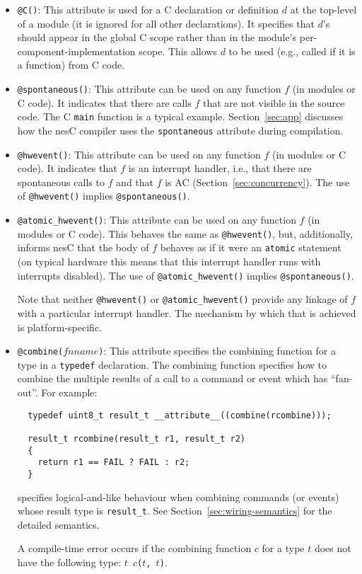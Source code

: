 \documentclass[11pt,letterpaper]{article}
\newcommand{\kw}[1]{{\tt #1}}
\newcommand{\code}[1]{{\tt #1}}
\newcommand{\nesc}{nesC\xspace}
\begin{document}
\begin{itemize}
\item \code{@C()}: This attribute is used for a C declaration or definition
$d$ at the top-level of a module (it is ignored for all other
declarations). It specifies that $d$'s should appear in the global C scope
rather than in the module's per-component-implementation scope. This allows
$d$ to be used (e.g., called if it is a function) from C code.

\item \code{@spontaneous()}: This attribute can be used on any function $f$
(in modules or C code). It indicates that there are calls $f$ that are not
visible in the source code. The C \code{main} function is a typical
example. Section~\ref{sec:app} discusses how the \nesc compiler uses the
\code{spontaneous} attribute during compilation.

\item \code{@hwevent()}: This attribute can be used on any function $f$ (in
modules or C code). It indicates that $f$ is an interrupt handler, i.e.,
that there are spontaneous calls to $f$ and that $f$ is AC
(Section~\ref{sec:concurrency}). The use of \code{@hwevent()} implies
\code{@spontaneous()}.

\item \code{@atomic\_hwevent()}: This attribute can be used on any function
$f$ (in modules or C code). This behaves the same as \code{@hwevent()}, but,
additionally, informs \nesc that the body of $f$ behaves as if it were an
\kw{atomic} statement (on typical hardware this means that this interrupt
handler runs with interrupts disabled). The use of \code{@atomic\_hwevent()}
implies \code{@spontaneous()}.

Note that neither \code{@hwevent()} or \code{@atomic\_hwevent()} provide any
linkage of $f$ with a particular interrupt handler. The mechanism by
which that is achieved is platform-specific.

\item \code{@combine($fnname$)}: This attribute specifies the combining
function for a type in a \kw{typedef} declaration. The combining function
specifies how to combine the multiple results of a call to a command
or event which has ``fan-out''. For example:
\begin{verbatim}
  typedef uint8_t result_t __attribute__((combine(rcombine)));

  result_t rcombine(result_t r1, result_t r2)
  {
    return r1 == FAIL ? FAIL : r2;
  }
\end{verbatim}
specifies logical-and-like behaviour when combining commands (or events)
whose result type is \code{result\_t}. See
Section~\ref{sec:wiring-semantics} for the detailed semantics.

A compile-time error occurs if the combining function $c$ for a type $t$
does not have the following type: \code{$t$ $c$($t$, $t$)}.

\end{itemize}
\end{document}
